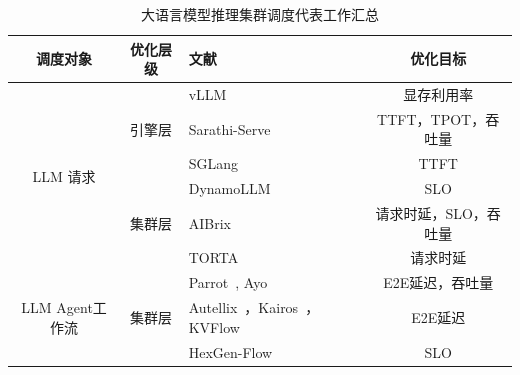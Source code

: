 \begin{table}[htbp]
    \centering
    \small %
    \setlength{\tabcolsep}{4pt} %
    \begin{threeparttable}
      \caption{大语言模型推理集群调度代表工作汇总}
      \label{tab:llm-sched-survey}
      \begin{tabularx}{\textwidth}{c c X c}
        \toprule
        调度对象 & 优化层级 & 文献 & 优化目标 \\
        \midrule
        
        \multirow{6}{*}{LLM 请求} & \multirow{3}{*}{引擎层} & vLLM~\cite{kwon2023efficient} & 显存利用率 \\
                                  &                         & Sarathi-Serve~\cite{agrawal2024taming} & TTFT，TPOT，吞吐量 \\
                                  &                         & SGLang~\cite{zheng2024sglang}          & TTFT \\
        \cmidrule{2-4} %
        
                                  & \multirow{3}{*}{集群层} & DynamoLLM~\cite{stojkovic2025dynamollm}& SLO \\
                                  &                         & AIBrix~\cite{team2025aibrix}           & 请求时延，SLO，吞吐量 \\
                                  &                         & TORTA~\cite{du2025temporal}            & 请求时延 \\
        \midrule %
        
        \multirow{3}{*}{LLM Agent工作流} & \multirow{3}{*}{集群层} & Parrot~\cite{lin2024parrot}, Ayo~\cite{tan2025towards} & E2E延迟，吞吐量 \\
                                         &                        & Autellix~\cite{luo2025autellix}，Kairos~\cite{chen2025kairos}，KVFlow~\cite{pan2025kvflow} & E2E延迟 \\
                                         &                        & HexGen-Flow~\cite{peng2025hexgen} & SLO \\
        \bottomrule
      \end{tabularx}
    \end{threeparttable}
  \end{table}

